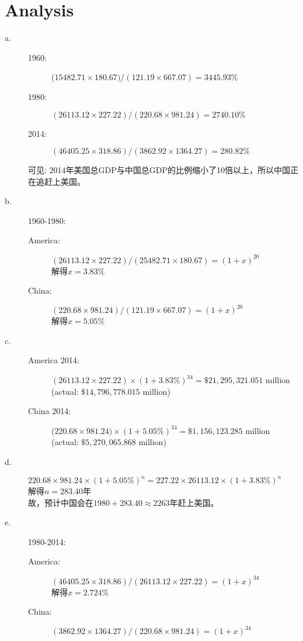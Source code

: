 \documentclass[UTF8, onecolumn, a4paper]{article}
\begin{document}
\section{Analysis}
\begin{description}
\item[a.]\quad
\begin{description}
\item[1960:]($15482.71\times180.67) / (121.19 \times 667.07) = 3445.93\%$
\item[1980:]$(26113.12\times227.22) / (220.68 \times 981.24) = 2740.10\%$	\item[2014:]$(46405.25\times318.86) / (3862.92 \times 1364.27) = 280.82\%$
\end{description}
可见: 2014年美国总GDP与中国总GDP的比例缩小了10倍以上，所以中国正在追赶上美国。
\item[b.]1960-1980:\quad
\begin{description}
\item[America:]$(26113.12\times227.22) / (25482.71\times180.67) = (1 + x)^{20}$\\
解得$x = 3.83\%$ 
\item[China:]$(220.68\times981.24) / (121.19\times667.07) = (1+x)^{20}$\\
解得$x = 5.05\%$
\end{description}
\item[c.]\quad
\begin{description}
\item[America 2014:]$(26113.12\times227.22)\times(1+3.83\%)^34 = \$21,295,321.051$ million\\(actual: $\$14,796,778.015$ million)
\item[China 2014:]($220.68\times981.24)\times(1+5.05\%)^34 = \$1,156,123.285$ million\\(actual: $\$5,270,065.868$ million)
\end{description}
\item[d.]$220.68\times981.24\times(1+5.05\%)^n = 227.22\times26113.12\times(1+3.83\%)^n$\\解得$n = 283.40$年\\
故，预计中国会在$1980+283.40\approx2263$年赶上美国。
\item[e.]1980-2014:\quad
\begin{description}
\item[America:]$(46405.25\times318.86) / (26113.12\times227.22) = (1 + x)^{34}$\\
解得$x = 2.724\%$ 
\item[China:]$(3862.92\times1364.27) / (220.68\times981.24) = (1+x)^{34}$\\

\end{description}
\end{description}
\end{document}
